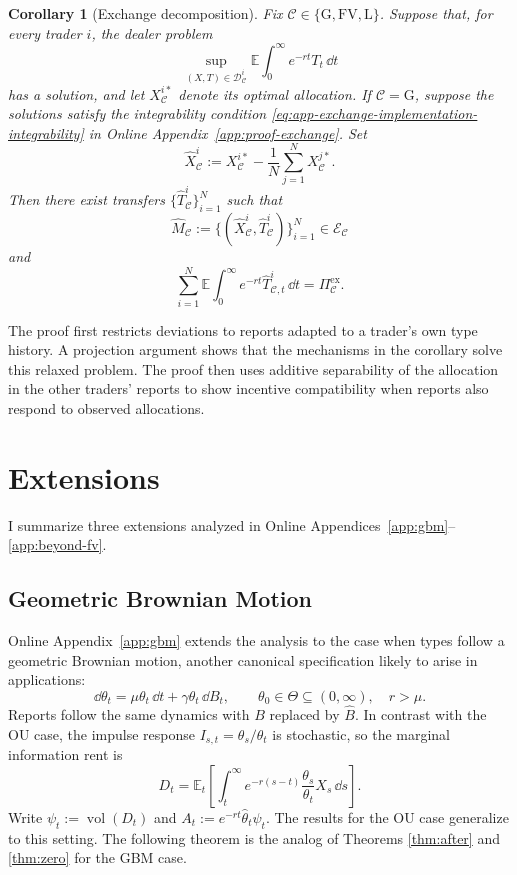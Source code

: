 \documentclass[12pt]{article}
\newtheorem{corollary}{Corollary}[theorem]
\DeclareMathOperator{\vol}{vol}
\newcommand{\E}{\mathbb{E}}
\newcommand{\hth}{\hat\theta}
\newcommand{\hB}{\hat B}
\begin{document}
\begin{corollary}[Exchange decomposition]\label{cor:app-exchange}
Fix \(\mathcal C\in\{\mathrm G,\mathrm{FV},\mathrm L\}\). Suppose that,
for every trader \(i\), the dealer problem
\[
  \sup_{(X,T)\in\mathcal D_{\mathcal C}^i}
  \E\int_0^\infty e^{-rt}T_t\,\dd t
\]
has a solution, and let \(X_{\mathcal C}^{i\ast}\) denote its optimal
allocation. If \(\mathcal C=\mathrm G\), suppose the solutions satisfy
the integrability condition
\eqref{eq:app-exchange-implementation-integrability} in Online
Appendix~\ref{app:proof-exchange}. Set
\[
  \widehat X_{\mathcal C}^i
  :=
  X_{\mathcal C}^{i\ast}
  -\frac1N\sum_{j=1}^N X_{\mathcal C}^{j\ast}.
\]
Then there exist transfers
\(\{\widehat T_{\mathcal C}^i\}_{i=1}^N\) such that
\[
  \widehat M_{\mathcal C}
  :=
  \bigl\{
    (\widehat X_{\mathcal C}^i,\widehat T_{\mathcal C}^i)
  \bigr\}_{i=1}^N
  \in\mathcal E_{\mathcal C}
\]
and
\[
  \sum_{i=1}^N
  \E\int_0^\infty e^{-rt}\widehat T_{\mathcal C,t}^i\,\dd t
  =
  \Pi_{\mathcal C}^{\mathrm{ex}}.
\]
\end{corollary}

The proof first restricts deviations to reports adapted to a trader's
own type history. A projection argument shows that the mechanisms in
the corollary solve this relaxed problem. The proof then uses additive separability of the allocation in the
other traders' reports to show incentive
compatibility when reports also respond to observed allocations.

\section{Extensions}\label{sec:extensions}

I summarize three extensions analyzed in Online
Appendices~\ref{app:gbm}--\ref{app:beyond-fv}.

\subsection{Geometric Brownian Motion}
\label{sec:gbm}

Online Appendix~\ref{app:gbm} extends the analysis to the case when types follow a geometric
Brownian motion, another canonical specification  likely to arise in applications:
\[
  \dd\theta_t=\mu\theta_t\,\dd t+\gamma\theta_t\,\dd B_t,
  \qquad \theta_0\in\Theta\subseteq(0,\infty),\quad r>\mu.
\]
Reports follow the same dynamics with \(B\) replaced by \(\hB\).
In contrast with the OU case, the impulse response \(I_{s,t}=\theta_s/\theta_t\) is stochastic,
so the marginal information rent is
\begin{equation}\label{eq:gbm-rent}
  D_t=\E_t\!\left[\int_t^\infty e^{-r(s-t)}
    \frac{\theta_s}{\theta_t}X_s\,\dd s\right].
\end{equation}
Write \(\psi_t:=\vol(D_t)\) and
\(A_t:=e^{-rt}\hth_t\psi_t\). The results for the OU case generalize to this setting. The following theorem is the analog of Theorems \ref{thm:after} and \ref{thm:zero} for the GBM case. 
\end{document}
